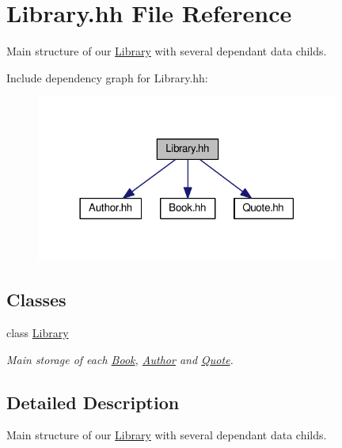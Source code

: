 \hypertarget{_library_8hh}{}\section{Library.\+hh File Reference}
\label{_library_8hh}


Main structure of our \hyperlink{class_library}{Library} with several dependant data childs.  


Include dependency graph for Library.\+hh\+:
\nopagebreak
\begin{figure}[H]
\begin{center}
\leavevmode
\includegraphics[width=282pt]{_library_8hh__incl}
\end{center}
\end{figure}
\subsection*{Classes}
\begin{DoxyCompactItemize}
\item 
class \hyperlink{class_library}{Library}
\begin{DoxyCompactList}\small\item\em Main storage of each \hyperlink{class_book}{Book}, \hyperlink{class_author}{Author} and \hyperlink{class_quote}{Quote}. \end{DoxyCompactList}\end{DoxyCompactItemize}


\subsection{Detailed Description}
Main structure of our \hyperlink{class_library}{Library} with several dependant data childs. 

